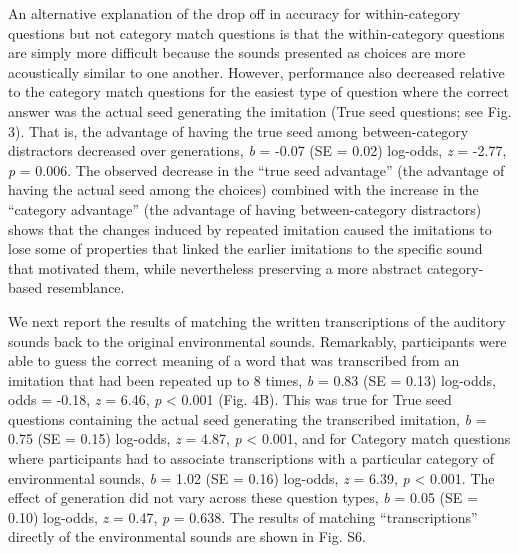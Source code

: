 \documentclass[english,floatsintext,man]{apa6}
\theoremstyle{definition}
\theoremstyle{definition}
\theoremstyle{definition}
\theoremstyle{remark}
\begin{document}
An alternative explanation of the drop off in accuracy for
within-category questions but not category match questions is that the
within-category questions are simply more difficult because the sounds
presented as choices are more acoustically similar to one another.
However, performance also decreased relative to the category match
questions for the easiest type of question where the correct answer was
the actual seed generating the imitation (True seed questions; see Fig.
3). That is, the advantage of having the true seed among
between-category distractors decreased over generations, \emph{b} =
-0.07 (SE = 0.02) log-odds, \emph{z} = -2.77, \emph{p} = 0.006. The
observed decrease in the \enquote{true seed advantage} (the advantage of
having the actual seed among the choices) combined with the increase in
the \enquote{category advantage} (the advantage of having
between-category distractors) shows that the changes induced by repeated
imitation caused the imitations to lose some of properties that linked
the earlier imitations to the specific sound that motivated them, while
nevertheless preserving a more abstract category-based resemblance.

We next report the results of matching the written transcriptions of the
auditory sounds back to the original environmental sounds. Remarkably,
participants were able to guess the correct meaning of a word that was
transcribed from an imitation that had been repeated up to 8 times,
\emph{b} = 0.83 (SE = 0.13) log-odds, odds = -0.18, \emph{z} = 6.46,
\emph{p} \textless{} 0.001 (Fig. 4B). This was true for True seed
questions containing the actual seed generating the transcribed
imitation, \emph{b} = 0.75 (SE = 0.15) log-odds, \emph{z} = 4.87,
\emph{p} \textless{} 0.001, and for Category match questions where
participants had to associate transcriptions with a particular category
of environmental sounds, \emph{b} = 1.02 (SE = 0.16) log-odds, \emph{z}
= 6.39, \emph{p} \textless{} 0.001. The effect of generation did not
vary across these question types, \emph{b} = 0.05 (SE = 0.10) log-odds,
\emph{z} = 0.47, \emph{p} = 0.638. The results of matching
\enquote{transcriptions} directly of the environmental sounds are shown
in Fig. S6.
\end{document}
